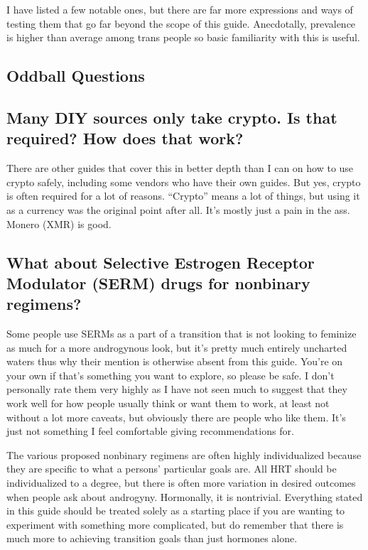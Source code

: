 \documentclass{article}
\begin{document}
I have listed a few notable ones, but there are far more expressions and ways of testing them that go far beyond the scope of this guide. Anecdotally, prevalence is higher than average among trans people so basic familiarity with this is useful.

\subsection*{Oddball Questions}

\subsection{Many DIY sources only take crypto. Is that required? How does that work?}

There are other guides that cover this in better depth than I can on how to use crypto safely, including some vendors who have their own guides. But yes, crypto is often required for a lot of reasons. “Crypto” means a lot of things, but using it as a currency was the original point after all. It’s mostly just a pain in the ass. Monero (XMR) is good.

\subsection{What about Selective Estrogen Receptor Modulator (SERM) drugs for nonbinary regimens?}

Some people use SERMs as a part of a transition that is not looking to feminize as much for a more androgynous look, but it’s pretty much entirely uncharted waters thus why their mention is otherwise absent from this guide. You’re on your own if that’s something you want to explore, so please be safe. I don’t personally rate them very highly as I have not seen much to suggest that they work well for how people usually think or want them to work, at least not without a lot more caveats, but obviously there are people who like them. It's just not something I feel comfortable giving recommendations for.

The various proposed nonbinary regimens are often highly individualized because they are specific to what a persons' particular goals are. All HRT should be individualized to a degree, but there is often more variation in desired outcomes when people ask about androgyny. Hormonally, it is nontrivial. Everything stated in this guide should be treated solely as a starting place if you are wanting to experiment with something more complicated, but do remember that there is much more to achieving transition goals than just hormones alone.
\end{document}
